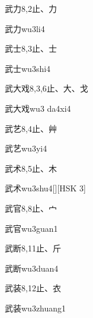 \begin{Entry}{武力}{8,2}{⽌、⼒}
  \begin{Phonetics}{武力}{wu3li4}
  \end{Phonetics}
\end{Entry}

\begin{Entry}{武士}{8,3}{⽌、⼠}
  \begin{Phonetics}{武士}{wu3shi4}
  \end{Phonetics}
\end{Entry}

\begin{Entry}{武大戏}{8,3,6}{⽌、⼤、⼽}
  \begin{Phonetics}{武大戏}{wu3 da4xi4}
  \end{Phonetics}
\end{Entry}

\begin{Entry}{武艺}{8,4}{⽌、⾋}
  \begin{Phonetics}{武艺}{wu3yi4}
  \end{Phonetics}
\end{Entry}

\begin{Entry}{武术}{8,5}{⽌、⽊}
  \begin{Phonetics}{武术}{wu3shu4}[][HSK 3]
  \end{Phonetics}
\end{Entry}

\begin{Entry}{武官}{8,8}{⽌、⼧}
  \begin{Phonetics}{武官}{wu3guan1}
  \end{Phonetics}
\end{Entry}

\begin{Entry}{武断}{8,11}{⽌、⽄}
  \begin{Phonetics}{武断}{wu3duan4}
  \end{Phonetics}
\end{Entry}

\begin{Entry}{武装}{8,12}{⽌、⾐}
  \begin{Phonetics}{武装}{wu3zhuang1}
  \end{Phonetics}
\end{Entry}

